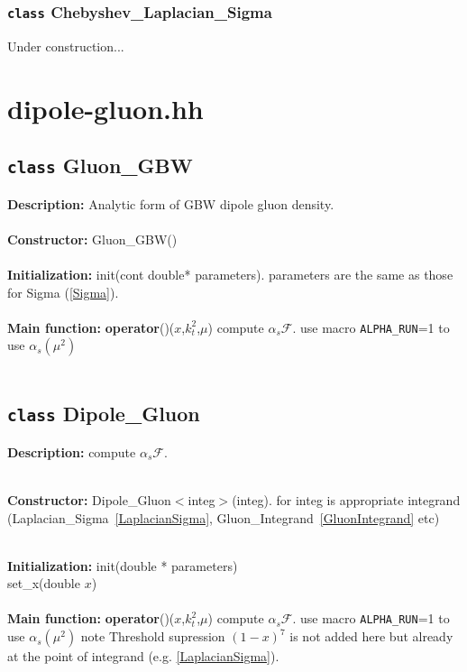 \documentclass[12pt]{article}
\newenvironment{entry}[1]{\textbf{\large #1:  }}{\\\vspace{3mm}\\}
\begin{document}
\subsubsection{\texttt{class} Chebyshev\_Laplacian\_Sigma}
Under construction...


\section{dipole-gluon.hh}
\subsection{\texttt{class} Gluon\_GBW}
\begin{entry}{Description}
	Analytic form of GBW dipole gluon density.	
\end{entry}
\begin{entry}{Constructor}
	Gluon\_GBW()
\end{entry}
\begin{entry}{Initialization}
	init(cont double* parameters).
	parameters are the same as those for Sigma (\ref{Sigma}).
\end{entry}
\begin{entry}{Main function}
	\textbf{operator}()($x$,$k_t^2$,$\mu$) 
	compute $\alpha_s\mathcal{F}$. 
	use macro \texttt{ALPHA\_RUN}=1 to use $\alpha_s(\mu^2)$
\end{entry}
\subsection{\texttt{class} Dipole\_Gluon}\label{DipoleGluon}
\begin{entry}{Description}
	compute $\alpha_s\mathcal{F}$.
\end{entry}

\begin{entry}{Constructor}
	Dipole\_Gluon$<$integ$>$(integ).
	for integ  is appropriate integrand (Laplacian\_Sigma~\ref{LaplacianSigma}, Gluon\_Integrand~\ref{GluonIntegrand} etc)
\end{entry}

\begin{entry}{Initialization}
	init(double * parameters)\\
	set\_x(double $x$) 
\end{entry}
\begin{entry}{Main function}
	\textbf{operator}()($x$,$k_t^2$,$\mu$) 
	compute $\alpha_s\mathcal{F}$. 
	use macro \texttt{ALPHA\_RUN}=1 to use $\alpha_s(\mu^2)$
	note Threshold supression $(1-x)^7$ is not added here but already at the point of integrand (e.g. \ref{LaplacianSigma}). 
\end{entry}
\end{document}
